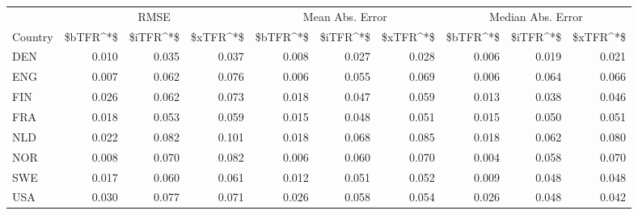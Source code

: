 \begin{table}[!h]
\centering
\begin{tabular}{l|r|r|r|r|r|r|r|r|r}
\hline
\multicolumn{1}{c|}{ } & \multicolumn{3}{c|}{RMSE} & \multicolumn{3}{c|}{Mean Abs. Error} & \multicolumn{3}{c}{Median Abs. Error} \\
\cline{2-4} \cline{5-7} \cline{8-10}
Country & \$bTFR\textasciicircum{}*\$ & \$iTFR\textasciicircum{}*\$ & \$xTFR\textasciicircum{}*\$ & \$bTFR\textasciicircum{}*\$ & \$iTFR\textasciicircum{}*\$ & \$xTFR\textasciicircum{}*\$ & \$bTFR\textasciicircum{}*\$ & \$iTFR\textasciicircum{}*\$ & \$xTFR\textasciicircum{}*\$\\
\hline
DEN & 0.010 & 0.035 & 0.037 & 0.008 & 0.027 & 0.028 & 0.006 & 0.019 & 0.021\\
ENG & 0.007 & 0.062 & 0.076 & 0.006 & 0.055 & 0.069 & 0.006 & 0.064 & 0.066\\
FIN & 0.026 & 0.062 & 0.073 & 0.018 & 0.047 & 0.059 & 0.013 & 0.038 & 0.046\\
FRA & 0.018 & 0.053 & 0.059 & 0.015 & 0.048 & 0.051 & 0.015 & 0.050 & 0.051\\
NLD & 0.022 & 0.082 & 0.101 & 0.018 & 0.068 & 0.085 & 0.018 & 0.062 & 0.080\\
NOR & 0.008 & 0.070 & 0.082 & 0.006 & 0.060 & 0.070 & 0.004 & 0.058 & 0.070\\
SWE & 0.017 & 0.060 & 0.061 & 0.012 & 0.051 & 0.052 & 0.009 & 0.048 & 0.048\\
USA & 0.030 & 0.077 & 0.071 & 0.026 & 0.058 & 0.054 & 0.026 & 0.048 & 0.042\\
\hline
\end{tabular}
\end{table}
